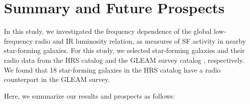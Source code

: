 \chapter{Summary and Future Prospects}\label{chap:summary}
%
%

In this study, we investigated the frequency dependence of the global low-frequency radio and IR luminosity relation, as measures of SF activity in nearby star-forming galaxies.
For this study, we selected star-forming galaxies and their radio data from the HRS catalog \citep{Boselli2010} and the GLEAM survey catalog \citep{Hurley-Walker2017a}, respectively. We found that 18 star-forming galaxies in the HRS catalog have a radio counterpart in the GLEAM survey.

Here, we summarize our results and prospects as follows:

